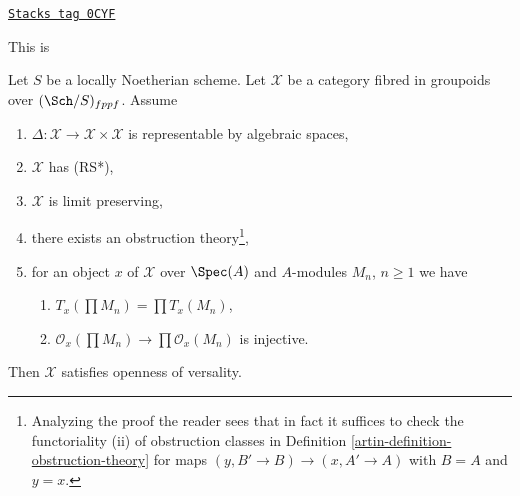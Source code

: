 \begin{lemma}
\label{artin-lemma-get-openness-obstruction-theory}
\href{https://stacks.math.columbia.edu/tag/0CYF}{\texttt{Stacks tag 0CYF}}

\begin{reference}
This is \cite[Theorem 4.4]{Hall-coherent}
\end{reference}
Let $S$ be a locally Noetherian scheme. Let $\mathcal{X}$ be a category fibred
in groupoids over $(\Sch/S)_{fppf}$. Assume
\begin{enumerate}
\item $\Delta : \mathcal{X} \to \mathcal{X} \times \mathcal{X}$ is
representable by algebraic spaces,
\item $\mathcal{X}$ has (RS*),
\item $\mathcal{X}$ is limit preserving,
\item there exists an obstruction theory\footnote{Analyzing the proof
the reader sees that in fact it suffices to check
the functoriality (ii) of obstruction classes in
Definition \ref{artin-definition-obstruction-theory}
for maps $(y, B' \to B) \to (x, A' \to A)$
with $B = A$ and $y = x$.},
\item for an object $x$ of $\mathcal{X}$ over $\Spec(A)$
and $A$-modules $M_n$, $n \geq 1$ we have
\begin{enumerate}
\item $T_x(\prod M_n) = \prod T_x(M_n)$,
\item $\mathcal{O}_x(\prod M_n) \to \prod \mathcal{O}_x(M_n)$
is injective.
\end{enumerate}
\end{enumerate}
Then $\mathcal{X}$ satisfies openness of versality.
\end{lemma}

